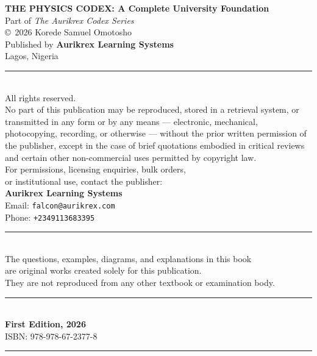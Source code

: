 
\thispagestyle{empty}
\vspace*{\fill}

\begin{center}
{\small

\textbf{THE PHYSICS CODEX: A Complete University Foundation}\\[0.5cm]

Part of \textit{The Aurikrex Codex Series}\\[1cm]

\copyright\ 2026 Korede Samuel Omotosho\\[0.3cm]

Published by \textbf{Aurikrex Learning Systems}\\
Lagos, Nigeria\\[0.5cm]

\rule{0.5\textwidth}{0.3pt}\\[0.5cm]

All rights reserved.\\[0.3cm]

No part of this publication may be reproduced, stored in a retrieval
system, or transmitted in any form or by any means --- electronic,
mechanical, photocopying, recording, or otherwise --- without the
prior written permission of the publisher, except in the case of
brief quotations embodied in critical reviews and certain other
non-commercial uses permitted by copyright law.\\[0.5cm]

For permissions, licensing enquiries, bulk orders,\\
or institutional use, contact the publisher:\\[0.3cm]

\textbf{Aurikrex Learning Systems}\\
Email: \texttt{falcon@aurikrex.com}\\
Phone: \texttt{+2349113683395}\\[0.5cm]

\rule{0.5\textwidth}{0.3pt}\\[0.5cm]

The questions, examples, diagrams, and explanations in this book\\
are original works created solely for this publication.\\
They are not reproduced from any other textbook or examination body.\\[0.5cm]

\rule{0.5\textwidth}{0.3pt}\\[0.5cm]

\textbf{First Edition, 2026}\\[0.3cm]

ISBN: 978-978-67-2377-8\\[0.5cm]

\rule{0.5\textwidth}{0.3pt}\\[0.3cm]
}
\end{center}

\vspace*{\fill}
